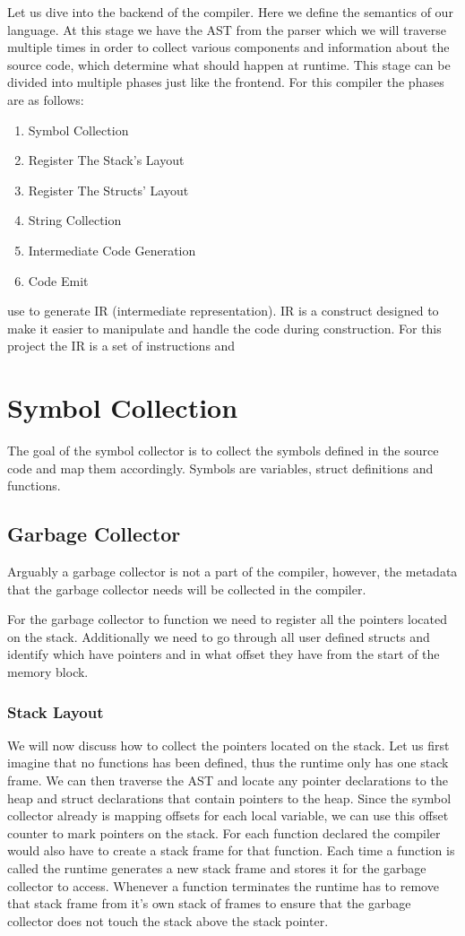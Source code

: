 Let us dive into the backend of the compiler. Here we define the semantics of our language. At this stage we have the AST from the parser which we will traverse multiple times in order to collect various components and information about the source code, which determine what should happen at runtime. This stage can be divided into multiple phases just like the frontend. For this compiler the phases are as follows: 
\begin{enumerate}
    \item Symbol Collection
    \item Register The Stack's Layout
    \item Register The Structs' Layout
    \item String Collection
    \item Intermediate Code Generation
    \item Code Emit
\end{enumerate}


use to generate IR (intermediate representation). IR is a construct designed to make it easier to manipulate and handle the code during construction. For this project the IR is a set of instructions and 

\section*{Symbol Collection}
The goal of the symbol collector is to collect the symbols defined in the source code and map them accordingly. Symbols are variables, struct definitions and functions. 

\subsection*{Garbage Collector}
Arguably a garbage collector is not a part of the compiler, however, the metadata that the garbage collector needs will be collected in the compiler.


For the garbage collector to function we need to register all the pointers located on the stack. Additionally we need to go through all user defined structs and identify which have pointers and in what offset they have from the start of the memory block.
\subsubsection*{Stack Layout}
We will now discuss how to collect the pointers located on the stack. Let us first imagine that no functions has been defined, thus the runtime only has one stack frame. We can then traverse the AST and locate any pointer declarations to the heap and struct declarations that contain pointers to the heap. Since the symbol collector already is mapping offsets for each local variable, we can use this offset counter to mark pointers on the stack. 
For each function declared the compiler would also have to create a stack frame for that function. Each time a function is called the runtime generates a new stack frame and stores it for the garbage collector to access. Whenever a function terminates the runtime has to remove that stack frame from it's own stack of frames to ensure that the garbage collector does not touch the stack above the stack pointer.

